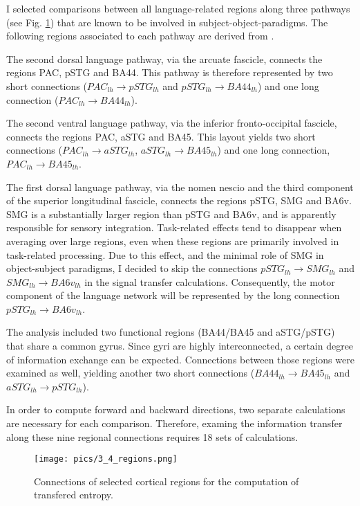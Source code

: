 I selected comparisons between all language-related regions along three pathways (see Fig. \ref{3.4.regions}) that are known to be involved in subject-object-paradigms.
The following regions associated to each pathway are derived from \cite{1.1.pathways}.

The second dorsal language pathway, via the arcuate fascicle, connects the regions PAC, pSTG and BA44.
This pathway is therefore represented by two short connections ($PAC_{lh} \rightarrow pSTG_{lh}$ and $pSTG_{lh} \rightarrow BA44_{lh}$) and one long connection ($PAC_{lh} \rightarrow BA44_{lh}$).

The second ventral language pathway, via the inferior fronto-occipital fascicle, connects the regions PAC, aSTG and BA45.
This layout yields two short connections ($PAC_{lh} \rightarrow aSTG_{lh}$, $aSTG_{lh} \rightarrow BA45_{lh}$) and one long connection, $PAC_{lh} \rightarrow BA45_{lh}$.

The first dorsal language pathway, via the nomen nescio and the third component of the superior longitudinal fascicle, connects the regions pSTG, SMG and BA6v.
SMG is a substantially larger region than pSTG and BA6v, and is apparently responsible for sensory integration.
Task-related effects tend to disappear when averaging over large regions, even when these regions are primarily involved in task-related processing.
Due to this effect, and the minimal role of SMG in object-subject paradigms, I decided to skip the connections $pSTG_{lh} \rightarrow SMG_{lh}$ and $SMG_{lh} \rightarrow BA6v_{lh}$ in the signal transfer calculations.
Consequently, the motor component of the language network will be represented by the long connection $pSTG_{lh} \rightarrow BA6v_{lh}$.

The analysis included two functional regions (BA44/BA45 and aSTG/pSTG) that share a common gyrus.
Since gyri are highly interconnected, a certain degree of information exchange can be expected.
Connections between those regions were examined as well, yielding another two short connections ($BA44_{lh} \rightarrow BA45_{lh}$ and $aSTG_{lh} \rightarrow pSTG_{lh}$).

In order to compute forward and backward directions, two separate calculations are necessary for each comparison.
Therefore, examing the information transfer along these nine regional connections requires 18 sets of calculations.

\begin{figure}[h]
\begin{center}
\vspace{7mm}
\texttt{[image: pics/3\_4\_regions.png]}
\caption{\label{3.4.regions} Connections of selected cortical regions for the computation of transfered entropy.}
\end{center}
\end{figure}

